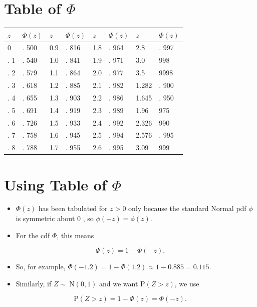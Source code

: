\documentclass[10pt]{article}
\begin{document}
\section*{Table of $\Phi$}
\begin{center}
\begin{tabular}{|l|l|l|l|l|l|l|l|}
\hline
$z$ & $\Phi(z)$ & $z$ & $\Phi(z)$ & $z$ & $\Phi(z)$ & $z$ & $\Phi(z)$ \\
\hline
0 & . 500 & 0.9 & . 816 & 1.8 & . 964 & 2.8 & . 997 \\
\hline
. 1 & . 540 & 1.0 & . 841 & 1.9 & . 971 & 3.0 & 998 \\
\hline
. 2 & . 579 & 1.1 & . 864 & 2.0 & . 977 & 3.5 & 9998 \\
\hline
. 3 & . 618 & 1.2 & . 885 & 2.1 & . 982 & 1.282 & . 900 \\
\hline
. 4 & . 655 & 1.3 & . 903 & 2.2 & . 986 & 1.645 & . 950 \\
\hline
. 5 & . 691 & 1.4 & . 919 & 2.3 & . 989 & 1.96 & 975 \\
\hline
. 6 & . 726 & 1.5 & . 933 & 2.4 & . 992 & 2.326 & 990 \\
\hline
. 7 & . 758 & 1.6 & . 945 & 2.5 & . 994 & 2.576 & . 995 \\
\hline
. 8 & . 788 & 1.7 & . 955 & 2.6 & . 995 & 3.09 & 999 \\
\hline
\end{tabular}
\end{center}

\section*{Using Table of $\Phi$}
\begin{itemize}
  \item $\Phi(z)$ has been tabulated for $z>0$ only because the standard Normal pdf $\phi$ is symmetric about 0 , so $\phi(-z)=\phi(z)$.
  \item For the cdf $\Phi$, this means
\end{itemize}

$$
\Phi(z)=1-\Phi(-z) .
$$

\begin{itemize}
  \item So, for example, $\Phi(-1.2)=1-\Phi(1.2) \approx 1-0.885=0.115$.
  \item Similarly, if $Z \sim \mathrm{~N}(0,1)$ and we want $\mathrm{P}(Z>z)$, we use
\end{itemize}

$$
\mathrm{P}(Z>z)=1-\Phi(z)=\Phi(-z) .
$$
\end{document}
